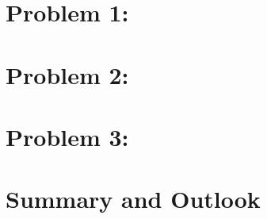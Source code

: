 \section{Problem 1: }


\section{Problem 2: }


\section{Problem 3: }


\section{Summary and Outlook}

 \\


